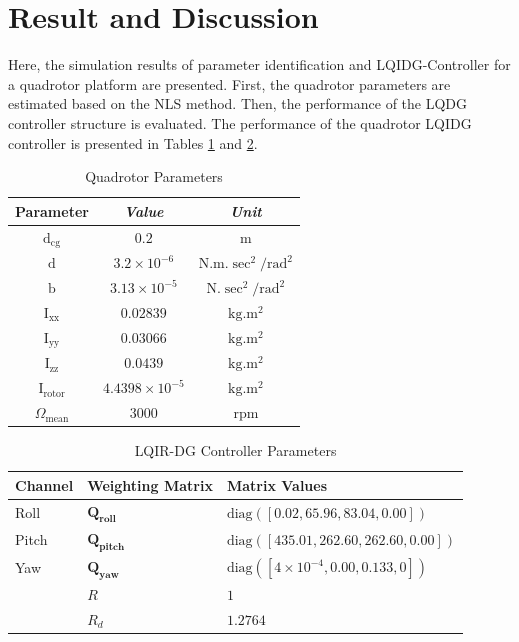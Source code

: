 \documentclass[preprint,12pt,authoryear]{elsarticle}
\begin{document}
\section{Result and Discussion}\label{sec:results}
\noindent Here, the simulation results of parameter identification and LQIDG-Controller for a quadrotor platform are presented. First, the quadrotor parameters are estimated based on the NLS method. Then, the performance of the LQDG controller structure is evaluated. The performance of the quadrotor LQIDG controller is presented in Tables \ref{tab:parameters} and \ref{tab:control weight_new}.
\begin{table}[H]
	\renewcommand{\arraystretch}{1.3}
	\caption{Quadrotor Parameters}
	\begin{center}
	\begin{tabular}{c c c}
	\hline
	\textbf{Parameter} & \textbf{\textit{Value}}& \textbf{\textit{Unit}} \\
	\hline
	$\mathrm{d}_{\text{cg}}$  & $0.2$ & $\mathrm{m}$\\
	$\mathrm{d}$  & $3.2\times10^{-6}$ & $\mathrm{N.m.\sec^2/rad^2}$\\
	$\mathrm{b}$  & $3.13\times10^{-5}$ & $\mathrm{N.\sec^2/rad^2}$ \\
	$\mathrm{I}_{\text{xx}}$ & $0.02839$ & $\mathrm{kg.m^2}$ \\
	$\mathrm{I}_{\text{yy}}$  & $0.03066$ & $\mathrm{kg.m^2}$\\
	$\mathrm{I}_{\text{zz}}$  & $0.0439$ & $\mathrm{kg.m^2}$ \\
	$\mathrm{I}_{\text{rotor}}$  & $4.4398\times 10^{-5}$ & $\mathrm{kg.m^2}$\\
	
	
	$\Omega_{\text{mean}}$ & $3000$ & $\mathrm{rpm}$\\
	
	\hline
	\end{tabular}
	\label{tab:parameters}
	\end{center}
\end{table}
\begin{table}[H]
	\centering
	\caption{LQIR-DG Controller Parameters}
	\renewcommand{\arraystretch}{1.3}
	\begin{tabular}{@{}lll@{}}
	\toprule
	\textbf{Channel} & \textbf{Weighting Matrix} & \textbf{Matrix Values} \\
	\midrule
	Roll & $\mathbf{Q_{roll}}$ & $\text{diag}([0.02, 65.96, 83.04, 0.00])$ \\
	Pitch & $\mathbf{Q_{pitch}}$ & $\text{diag}([435.01, 262.60, 262.60, 0.00])$ \\
	Yaw & $\mathbf{Q_{yaw}}$ & $\text{diag}([4 \times 10^{-4}, 0.00, 0.133, 0])$ \\
	& $R$ & $1$ \\
	&$R_d$ & $1.2764$ \\
	\bottomrule
	\end{tabular}
	\label{tab:control weight_new} %
\end{table}
\end{document}

